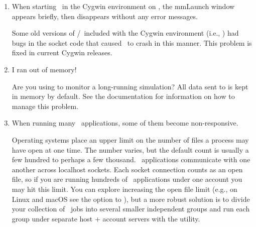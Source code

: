 \begin{enumerate}

\item When starting \OOMMF\ in the Cygwin environment on \Windows, the
mmLaunch window appears briefly, then disappears without any error
messages.

Some old versions of \Tcl/\Tk\ included with the Cygwin environment
(i.e., ) had bugs in the socket code
that caused \OOMMF\ to crash in this manner.  This problem is fixed in
current Cygwin releases.

\item I ran out of memory!

Are you using  to monitor a
long-running simulation?  All data sent to  is kept in
memory by default.  See the  documentation for information
on how to manage this problem.

\item When running many \OOMMF\ applications, some of them become
  non-responsive.

Operating systems place an upper limit on the number of files a process
may have open at one time. The number varies, but the default count is
usually a few hundred to perhaps a few thousand. \OOMMF\ applications
communicate with one another across localhost sockets. Each socket
connection counts as an open file, so if you are running hundreds of
\OOMMF\ applications under one account you may hit this limit. You can
explore increasing the open file limit (e.g., on Linux and macOS see the
 option to ), but a more robust solution is to
divide your collection of \OOMMF\ jobs into several smaller independent
groups and run each group under separate host + account servers with
the  utility.

\end{enumerate}

